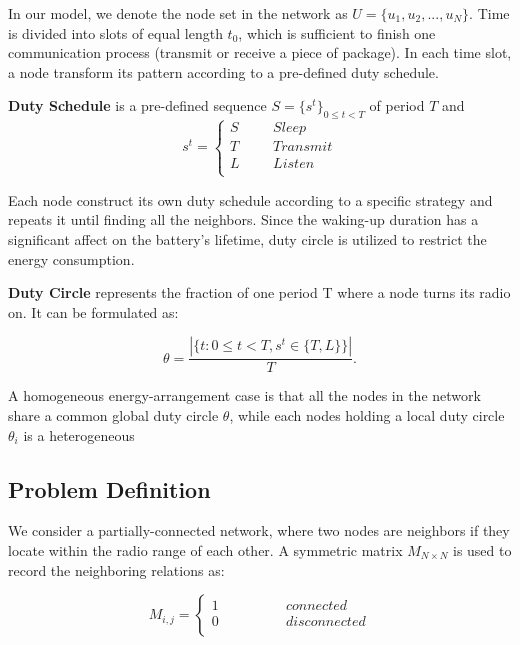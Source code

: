 In our model, we denote the node set in the network as $U = \{u_1,u_2,...,u_N\}$.
Time is divided into slots of equal length $t_0$, 
which is sufficient to finish  one communication process
(transmit or receive a piece of package). In each time slot, 
a node transform its pattern according to a pre-defined duty schedule.


\begin{definition}
\textbf{Duty Schedule} is a pre-defined sequence $S=\{s^t\}_{0\leq t<T}$ of period $T$ and
$$ s^t=\left\{
\begin{aligned}
S  & & & {Sleep}\\
T  & & & {Transmit}\\
L  & & & {Listen}\\
\end{aligned}
\right.
$$
\end{definition}

 Each node construct its own duty schedule according to a specific strategy and repeats it
 until finding all the neighbors. Since the waking-up duration has a significant affect on the battery's lifetime, 
 duty circle is utilized to restrict the energy consumption.

\begin{definition}
\textbf{Duty Circle} represents the fraction of one period T where a node turns its radio on. It can be formulated as:

$$\theta=\frac{|\{t: 0\leq t<T, s^t \in \{T,L\}\}|}{T}.
$$
  
\end{definition}

A homogeneous energy-arrangement case is that all the nodes
in the network share a common global duty circle $\theta$,
while each nodes holding a local duty circle $\theta_i$ is 
a heterogeneous


\subsection{Problem Definition}

We consider a partially-connected network, 
where two nodes are neighbors if they locate within the radio range of each other. 
A  symmetric matrix $M_{N\times N}$ is used to record the neighboring relations as:

$$ M_{i,j}=\left\{
\begin{aligned}
1  & & & & & & {connected}\\
0  & & & & & & {disconnected}\\
\end{aligned}
\right.
$$

